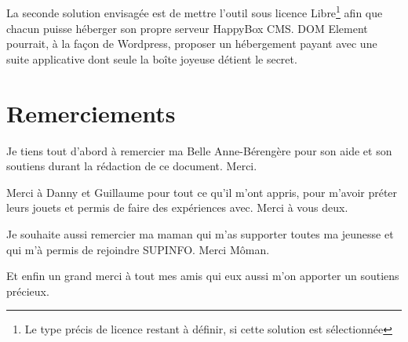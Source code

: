 \documentclass[11pt, a4paper ]{article}
\let\stdsection\section
\renewcommand\section{\newpage\stdsection}
\begin{document}
\begin{spacing}{1.5}
\subparagraph{}
La seconde solution envisagée est de mettre l'outil sous licence Libre\footnote{Le type précis de licence restant à définir, si cette solution est sélectionnée} afin que chacun puisse héberger son propre serveur HappyBox CMS. DOM Element pourrait, à la façon de Wordpress, proposer un hébergement payant avec une suite applicative dont seule la boîte joyeuse détient le secret.


\section{Remerciements}

Je tiens tout d'abord à remercier ma Belle Anne-Bérengère pour son aide et son soutiens durant la rédaction de ce document. Merci.

Merci à Danny et Guillaume pour tout ce qu'il m'ont appris, pour m'avoir préter leurs jouets et permis de faire des expériences avec. Merci à vous deux.

Je souhaite aussi remercier ma maman qui m'as supporter toutes ma jeunesse et qui m'à permis de rejoindre SUPINFO. Merci Môman.

Et enfin un grand merci à tout mes amis qui eux aussi m'on apporter un soutiens précieux.



	\appendix

\end{spacing}
\end{document}
